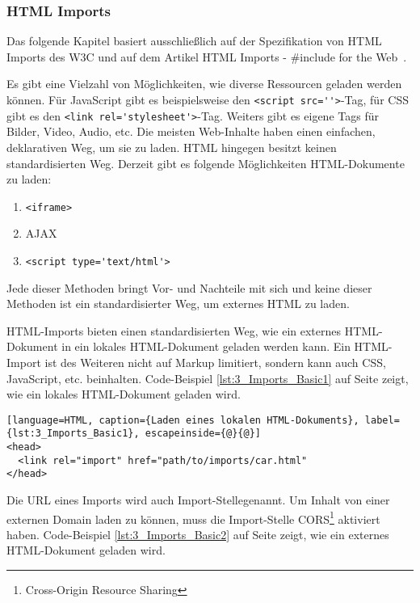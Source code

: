 \subsubsection{HTML Imports}
\label{sec:3_WC_Imports}

Das folgende Kapitel basiert ausschließlich auf der Spezifikation von HTML Imports des W3C \citereset \autocite[siehe][]{GlazkovMorrita.2013} und auf dem Artikel \glqq HTML Imports - \#include for the Web\grqq\ \citereset \autocite[siehe][]{BidelmanImports.2013}.

Es gibt eine Vielzahl von Möglichkeiten, wie diverse Ressourcen geladen werden können. Für JavaScript gibt es beispielsweise den \lstinline|<script src=''>|-Tag, für CSS gibt es den \lstinline|<link rel='stylesheet'>|-Tag. Weiters gibt es eigene Tags für Bilder, Video, Audio, etc. Die meisten Web-Inhalte haben einen einfachen, deklarativen Weg, um sie zu laden. HTML hingegen besitzt keinen standardisierten Weg. Derzeit gibt es folgende Möglichkeiten HTML-Dokumente zu laden:
\begin{enumerate}
\item \lstinline|<iframe>|
\item AJAX
\item \lstinline|<script type='text/html'>|
\end{enumerate}

Jede dieser Methoden bringt Vor- und Nachteile mit sich und keine dieser Methoden ist ein standardisierter Weg, um externes HTML zu laden.

HTML-Imports bieten einen standardisierten Weg, wie ein externes HTML-Dokument in ein lokales HTML-Dokument geladen werden kann. Ein HTML-Import ist des Weiteren nicht auf Markup limitiert, sondern kann auch CSS, JavaScript, etc. beinhalten. Code-Beispiel \ref{lst:3_Imports_Basic1} auf Seite \pageref{lst:3_Imports_Basic1} zeigt, wie ein lokales HTML-Dokument geladen wird.

\begin{lstlisting}[language=HTML, caption={Laden eines lokalen HTML-Dokuments}, label={lst:3_Imports_Basic1}, escapeinside={@}{@}]
<head>
  <link rel="import" href="path/to/imports/car.html"
</head>
\end{lstlisting}

Die URL eines Imports wird auch \glqq Import-Stelle\grqq genannt. Um Inhalt von einer externen Domain laden zu können, muss die Import-Stelle CORS\footnote{Cross-Origin Resource Sharing} aktiviert haben. Code-Beispiel \ref{lst:3_Imports_Basic2} auf Seite \pageref{lst:3_Imports_Basic2} zeigt, wie ein externes HTML-Dokument geladen wird.

